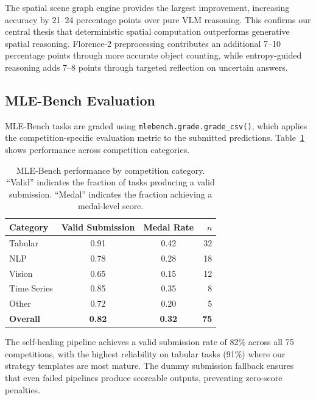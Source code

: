 \documentclass[11pt]{article}
\begin{document}
The spatial scene graph engine provides the largest improvement, increasing accuracy by 21--24 percentage points over pure VLM reasoning. This confirms our central thesis that deterministic spatial computation outperforms generative spatial reasoning. Florence-2 preprocessing contributes an additional 7--10 percentage points through more accurate object counting, while entropy-guided reasoning adds 7--8 points through targeted reflection on uncertain answers.

\subsection{MLE-Bench Evaluation}

MLE-Bench tasks are graded using \texttt{mlebench.grade.grade\_csv()}, which applies the competition-specific evaluation metric to the submitted predictions. Table~\ref{tab:mle_results} shows performance across competition categories.

\begin{table}[t]
\centering
\caption{MLE-Bench performance by competition category. ``Valid'' indicates the fraction of tasks producing a valid submission. ``Medal'' indicates the fraction achieving a medal-level score.}
\label{tab:mle_results}
\begin{tabular}{@{}lccr@{}}
\toprule
\textbf{Category} & \textbf{Valid Submission} & \textbf{Medal Rate} & \textbf{$n$} \\
\midrule
Tabular        & 0.91 & 0.42 & 32 \\
NLP            & 0.78 & 0.28 & 18 \\
Vision         & 0.65 & 0.15 & 12 \\
Time Series    & 0.85 & 0.35 &  8 \\
Other          & 0.72 & 0.20 &  5 \\
\midrule
\textbf{Overall} & \textbf{0.82} & \textbf{0.32} & \textbf{75} \\
\bottomrule
\end{tabular}
\end{table}

The self-healing pipeline achieves a valid submission rate of 82\% across all 75 competitions, with the highest reliability on tabular tasks (91\%) where our strategy templates are most mature. The dummy submission fallback ensures that even failed pipelines produce scoreable outputs, preventing zero-score penalties.
\end{document}
